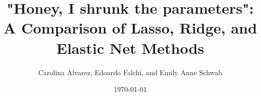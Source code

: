 \title[]%
{"Honey, I shrunk the parameters": A Comparison of Lasso, Ridge, and Elastic Net Methods}
\subtitle{}


\author[]%
{Carolina Alvarez, Edoardo Falchi, and Emily Anne Schwab}


\date{\today}

\subject{Report by Huangrui Mo}%

